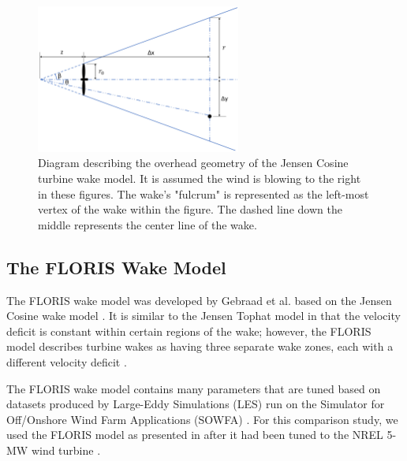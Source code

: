 \documentclass[a4paper]{jpconf}
\begin{document}
\begin{figure}[h]
	\label{fig:JensenDiagrams}
	\centering
	\includegraphics[width=0.6\textwidth]{JensenDiagramNew}
	\caption{Diagram describing the overhead geometry of the Jensen Cosine turbine wake model. It is assumed the wind is blowing to the right in these figures. The wake's "fulcrum" is represented as the left-most vertex of the wake within the figure. The dashed line down the middle represents the center line of the wake.}
\end{figure}

\subsection{The FLORIS Wake Model}
The FLORIS wake model was developed by Gebraad et al. based on the Jensen Cosine wake model \cite{gebraad2014}. It is similar to the Jensen Tophat model in that the velocity deficit is constant within certain regions of the wake; however, the FLORIS model describes turbine wakes as having three separate wake zones, each with a different velocity deficit %
\cite{gebraad2014}.

The FLORIS wake model contains many parameters that are tuned based on datasets produced by Large-Eddy Simulations (LES) run on the Simulator for Off/Onshore Wind Farm Applications (SOWFA) \cite{fleming2015}. For this comparison study, we used the FLORIS model as presented in \cite{thomas2016-improving-floris} after it had been tuned to the NREL 5-MW wind turbine \cite{jonkman2009}.
\end{document}
